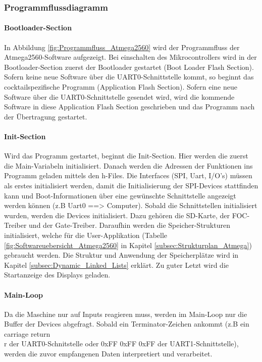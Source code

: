 \subsubsection{Programmflussdiagramm}
\label{subsubsec:Programmflussdiagramm}

\paragraph{Bootloader-Section}\mbox{}
In Abbildung \ref{fig:Programmfluss_Atmega2560} wird der Programmfluss der Atmega2560-Software aufgezeigt. Bei einschalten des Mikrocontrollers wird in der Bootloader-Section zuerst der Bootloader gestartet (Boot Loader Flash Section). Sofern keine neue Software über die UART0-Schnittstelle kommt, so beginnt das cocktailspezifische Programm (Application Flash Section). Sofern eine neue Software über die UART0-Schnittstelle gesendet wird, wird die kommende Software in diese Application Flash Section geschrieben und das Programm nach der Übertragung gestartet.

\paragraph{Init-Section}\mbox{}
Wird das Programm gestartet, beginnt die Init-Section. Hier werden die zuerst die Main-Variabeln initialisiert. Danach werden die Adressen der Funktionen ins Programm geladen mittels den h-Files. Die Interfaces (SPI, Uart, I/O's) müssen als erstes initialisiert werden, damit die Initialisierung der SPI-Devices stattfinden kann und Boot-Informationen über eine gewünschte Schnittstelle angezeigt werden können (z.B Uart0 ==> Computer). Sobald die Schnittstellen initialisiert wurden, werden die Devices initialisiert. Dazu gehören die SD-Karte, der FOC-Treiber und der Gate-Treiber. Daraufhin werden die Speicher-Strukturen initialisiert, welche für die User-Applikation (Tabelle \ref{fig:Softwareuebersicht_Atmega2560} in Kapitel \ref{subsec:Strukturplan_Atmega}) gebraucht werden. Die Struktur und Anwendung der Speicherplätze wird in Kapitel \ref{subsec:Dynamic_Linked_Lists} erklärt. Zu guter Letzt wird die Startanzeige des Displays geladen.

\paragraph{Main-Loop}

Da die Maschine nur auf Inputs reagieren muss, werden im Main-Loop nur die Buffer der Devices abgefragt. Sobald ein Terminator-Zeichen ankommt (z.B ein carriage return \\r der UART0-Schnitstelle oder 0xFF 0xFF 0xFF der UART1-Schnittstelle), werden die zuvor empfangenen Daten interpretiert und verarbeitet.
\newpage

